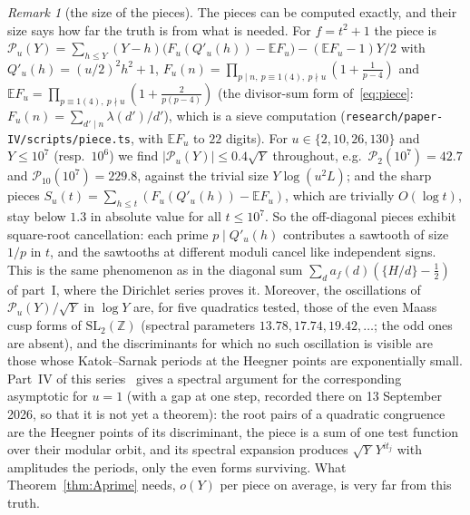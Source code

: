 \documentclass[11pt,a4paper]{article}
\theoremstyle{remark}\newtheorem{remark}[theorem]{Remark}
\newcommand{\Z}{\mathbb{Z}}\newcommand{\Q}{\mathbb{Q}}\newcommand{\F}{\mathbb{F}}\newcommand{\R}{\mathbb{R}}
\begin{document}
\begin{remark}[the size of the pieces]\label{rem:piecesize}
The pieces can be computed exactly, and their size says how far the truth is from what is needed. For $f=t^2+1$ the
piece is $\mathcal P_u(Y)=\sum_{h\le Y}(Y-h)\bigl(F_u(Q'_u(h))-\mathbb EF_u\bigr)-(\mathbb EF_u-1)Y/2$ with
$Q'_u(h)=(u/2)^2h^2+1$, $F_u(n)=\prod_{p\mid n,\ p\equiv1(4),\ p\nmid u}(1+\tfrac1{p-4})$ and
$\mathbb EF_u=\prod_{p\equiv1(4),\ p\nmid u}(1+\tfrac2{p(p-4)})$ (the divisor-sum form of~\eqref{eq:piece}: $F_u(n)=\sum_{d'\mid n}\lambda(d')/d'$),
which is a sieve computation (\texttt{research/paper-IV/scripts/piece.ts}, with $\mathbb EF_u$ to $22$ digits). For $u\in\{2,10,26,130\}$
and $Y\le10^7$ (resp.\ $10^6$) we find $|\mathcal P_u(Y)|\le0.4\sqrt Y$ throughout, e.g.\ $\mathcal P_2(10^7)=42.7$ and
$\mathcal P_{10}(10^7)=229.8$, against the trivial size $Y\log(u^2L)$; and the sharp pieces
$S_u(t)=\sum_{h\le t}(F_u(Q'_u(h))-\mathbb EF_u)$, which are trivially $O(\log t)$, stay below $1.3$ in absolute value for all
$t\le10^7$. So the off-diagonal pieces exhibit square-root cancellation: each prime $p\mid Q'_u(h)$ contributes a sawtooth
of size $1/p$ in $t$, and the sawtooths at different moduli cancel like independent signs. This is the same phenomenon as
in the diagonal sum $\sum_da_f(d)(\{H/d\}-\tfrac12)$ of part~I, where the Dirichlet series proves it. Moreover, the oscillations of
$\mathcal P_u(Y)/\sqrt Y$ in $\log Y$ are, for five quadratics tested, those of the even Maass cusp forms of $\mathrm{SL}_2(\Z)$
(spectral parameters $13.78,17.74,19.42,\dots$; the odd ones are absent), and the discriminants for which no such
oscillation is visible are those whose Katok--Sarnak periods at the Heegner points are exponentially small. Part~IV
of this series~\cite{ReichardtIV} gives a spectral argument for the corresponding asymptotic for $u=1$ (with a gap at
one step, recorded there on 13 September 2026, so that it is not yet a theorem): the root pairs of a quadratic
congruence are the Heegner points of its discriminant, the piece is a sum of one test function over their modular
orbit, and its spectral expansion produces $\sqrt Y\,Y^{it_j}$ with amplitudes the periods, only the even forms
surviving. What
Theorem~\ref{thm:Aprime} needs, $o(Y)$ per piece on average, is very far from this truth.
\end{remark}
\end{document}
